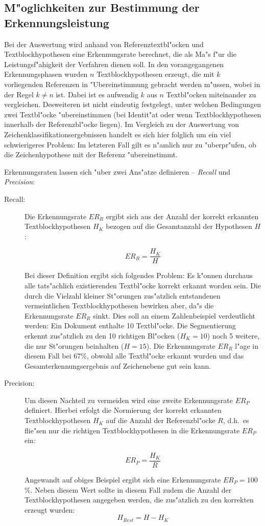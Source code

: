 \subsection{M"oglichkeiten zur Bestimmung der Erkennungsleistung}

Bei der Auswertung wird anhand von Referenztextbl"ocken und Textblockhypothesen
eine Erkennungsrate berechnet, die als Ma"s f"ur die Leistungsf"ahigkeit der Verfahren dienen soll.
In den vorangegangenen Erkennungsphasen wurden $n$ Textblockhypothesen erzeugt, die mit $k$
vorliegenden Referenzen in "Ubereinstimmung gebracht werden m"ussen, wobei in der Regel
$k \ne n$ ist. Dabei ist es aufwendig $k$ aus $n$ Textbl"ocken miteinander zu vergleichen.
Desweiteren ist nicht eindeutig festgelegt, unter welchen Bedingungen zwei Textbl"ocke
"ubereinstimmen (bei Identit"at oder wenn Textblockhypothesen innerhalb der Referenzbl"ocke liegen).
Im Vergleich zu der Auswertung von Zeichenklassifikationsergebnissen handelt es sich hier
folglich um ein viel schwierigeres Problem: Im letzteren Fall gilt es n"amlich nur zu
"uberpr"ufen, ob die Zeichenhypothese mit der Referenz "ubereinstimmt.

Erkennungsraten lassen sich "uber zwei Ans"atze definieren -- {\em Recall\/} und {\em Precision\/}:
\begin{description}
\item[Recall:]Die Erkennungsrate $ER_{R}$ ergibt sich aus der Anzahl der korrekt erkannten
Textblockhypothesen $H_K$ bezogen auf die Gesamtanzahl der Hypothesen $H$:

$$ER_{R} = \frac{H_K}{H}$$

Bei dieser Definition ergibt sich folgendes Problem: Es k"onnen durchaus alle tat\-s"ach\-lich
existierenden Textbl"ocke korrekt erkannt worden sein. Die durch die Vielzahl kleiner St"orungen
zus"atzlich entstandenen vermeintlichen Textblockhypothesen bewirken aber, da"s die
Erkennungsrate $ER_{R}$ sinkt. 
Dies soll an einem Zahlenbeispiel verdeutlicht werden: Ein Dokument
enthalte 10 Textbl"ocke. Die Segmentierung erkennt zus"atzlich zu den 10 richtigen Bl"ocken 
($H_K=10$) noch 5 weitere, die nur St"orungen beinhalten ($H=15$). 
Die Erkennungsrate $ER_{R}$ l"age in diesem Fall bei 67\%, obwohl alle Textbl"ocke erkannt wurden
und das Gesamterkennungsergebnis auf Zeichenebene gut sein kann.

\item[Precision:]Um diesen Nachteil zu vermeiden wird eine zweite Erkennungsrate $ER_{P}$ definiert. Hierbei
erfolgt die Normierung der korrekt erkannten Textblockhypothesen $H_K$ auf die Anzahl der
Referenzbl"ocke $R$, d.h.\ es flie"sen nur die richtigen Textblockhypothesen in die Erkennungsrate
$ER_{P}$ ein:

$$ER_{P} = \frac{H_K}{R}$$

Angewandt auf obiges Beispiel ergibt sich eine Erkennungsrate $ER_{P} = 100$\%. 
Neben diesem Wert sollte in diesem Fall zudem die Anzahl der Textblockhypothesen 
angegeben werden, die zus"atzlich zu den korrekten erzeugt wurden:
$$H_{Rest} = H - H_K$$
\end{description}

